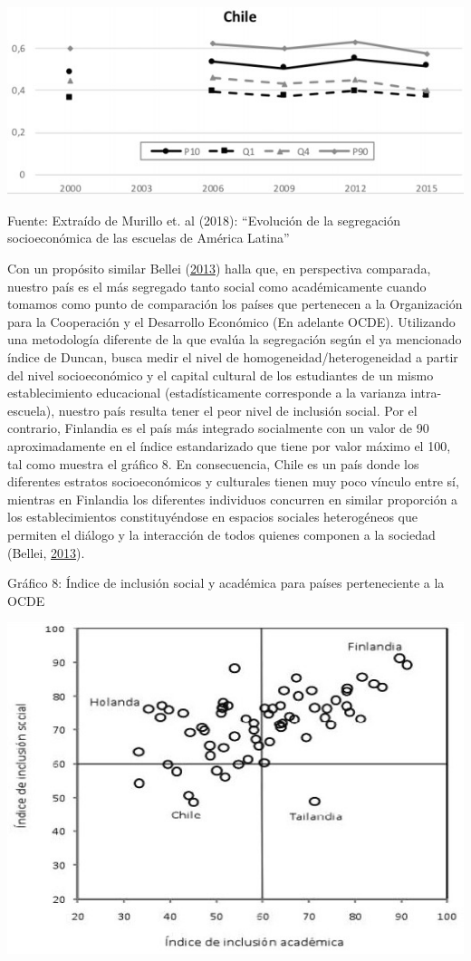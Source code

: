 \documentclass[
]{article}
\begin{document}
\includegraphics{input/images/evolucion_segregacion_quintiles.jpg}

Fuente: Extraído de Murillo et. al (2018): ``Evolución de la segregación
socioeconómica de las escuelas de América Latina''

Con un propósito similar Bellei
(\protect\hyperlink{ref-bellei_estudio_2013}{2013}) halla que, en
perspectiva comparada, nuestro país es el más segregado tanto social
como académicamente cuando tomamos como punto de comparación los países
que pertenecen a la Organización para la Cooperación y el Desarrollo
Económico (En adelante OCDE). Utilizando una metodología diferente de la
que evalúa la segregación según el ya mencionado índice de Duncan, busca
medir el nivel de homogeneidad/heterogeneidad a partir del nivel
socioeconómico y el capital cultural de los estudiantes de un mismo
establecimiento educacional (estadísticamente corresponde a la varianza
intra-escuela), nuestro país resulta tener el peor nivel de inclusión
social. Por el contrario, Finlandia es el país más integrado socialmente
con un valor de 90 aproximadamente en el índice estandarizado que tiene
por valor máximo el 100, tal como muestra el gráfico 8. En consecuencia,
Chile es un país donde los diferentes estratos socioeconómicos y
culturales tienen muy poco vínculo entre sí, mientras en Finlandia los
diferentes individuos concurren en similar proporción a los
establecimientos constituyéndose en espacios sociales heterogéneos que
permiten el diálogo y la interacción de todos quienes componen a la
sociedad (Bellei, \protect\hyperlink{ref-bellei_estudio_2013}{2013}).

Gráfico 8: Índice de inclusión social y académica para países
perteneciente a la OCDE

\includegraphics{input/images/inclusion_social.jpg}
\end{document}
